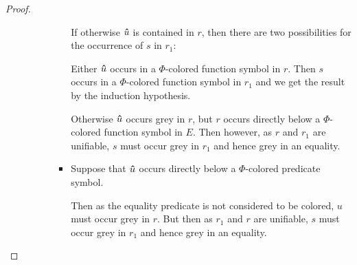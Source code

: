 \documentclass[%
	draft=false,%
	numbers=noendperiod,%
	11pt,%
	a4paper,%
	oneside,%
	openany,%
]{memoir}
\begin{document}
\begin{proof}
\begin{itemize}
\begin{itemize}
\begin{itemize}
\begin{itemize}
									If otherwise $\bm\hat u$ is contained in $r$, 
									then there are two possibilities for the occurrence of $s$ in $r_1$:

									Either $\bm\hat u$ occurs in a $\Phi$-colored function symbol in $r$. Then $s$ occurs in a $\Phi$-colored function symbol in $r_1$ and we get the result by the induction hypothesis.

									Otherwise $\bm\hat u$ occurs grey in $r$, but $r$ occurs directly below a $\Phi$-colored function symbol in $E$.
									Then however, as $r$ and $r_1$ are unifiable, $s$ must occur grey in $r_1$ and hence grey in an equality.

								\item
									Suppose that $\bm\hat u$ occurs directly below a $\Phi$-colored predicate symbol. 

									Then as the equality predicate is not considered to be colored, $u$ must occur grey in $r$.
									But then as $r_1$ and $r$ are unifiable, $s$ must occur grey in $r_1$ and hence grey in an equality.
									\qedhere
							\end{itemize}

					\end{itemize}

			\end{itemize}

	\end{itemize}


\end{proof}
\end{document}
